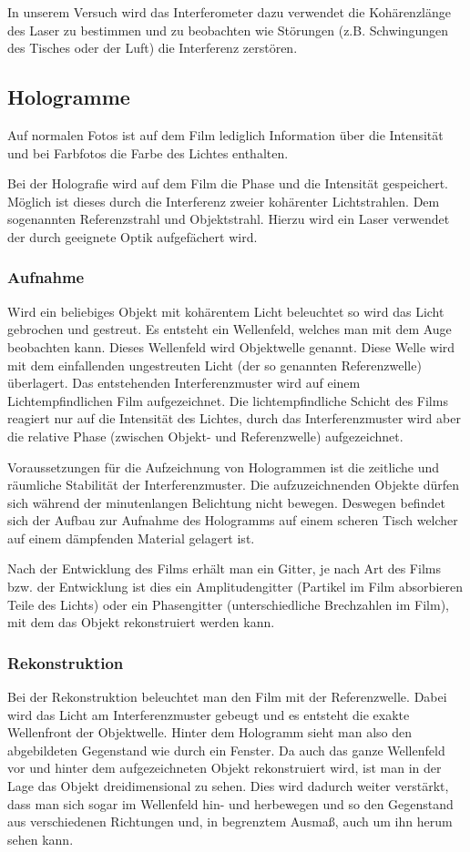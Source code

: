 \documentclass[12pt]{article}
\begin{document}
In unserem Versuch wird das Interferometer dazu verwendet die Kohärenzlänge des Laser zu bestimmen und zu beobachten wie Störungen
(z.B. Schwingungen des Tisches oder der Luft) die Interferenz zerstören.
\subsection{Hologramme}
Auf normalen Fotos ist auf dem Film lediglich Information über die Intensität und bei Farbfotos die Farbe des Lichtes enthalten.

Bei der Holografie wird auf dem Film die Phase und die Intensität gespeichert. Möglich ist dieses durch die Interferenz zweier kohärenter Lichtstrahlen.
Dem sogenannten Referenzstrahl und Objektstrahl. Hierzu wird ein Laser verwendet der durch geeignete Optik aufgefächert wird.
\subsubsection{Aufnahme}
Wird ein beliebiges Objekt mit kohärentem Licht beleuchtet so wird das Licht gebrochen und gestreut. Es entsteht ein Wellenfeld, welches man mit dem Auge
beobachten kann. Dieses Wellenfeld wird Objektwelle genannt. Diese Welle wird mit dem einfallenden ungestreuten Licht (der so genannten Referenzwelle)
überlagert. Das entstehenden Interferenzmuster wird auf einem Lichtempfindlichen Film aufgezeichnet. Die lichtempfindliche Schicht des Films reagiert nur auf
die Intensität des Lichtes, durch das Interferenzmuster wird aber die relative Phase (zwischen Objekt- und Referenzwelle) aufgezeichnet.

Voraussetzungen für die Aufzeichnung von Hologrammen ist die zeitliche und räumliche Stabilität der Interferenzmuster. Die aufzuzeichnenden Objekte dürfen
sich während der minutenlangen Belichtung nicht bewegen. Deswegen befindet sich der Aufbau zur Aufnahme des Hologramms auf einem scheren Tisch welcher auf 
einem dämpfenden Material gelagert ist. 

Nach der Entwicklung des Films erhält man ein Gitter, je nach Art des Films bzw. der Entwicklung ist dies ein Amplitudengitter (Partikel im Film absorbieren
Teile des Lichts) oder ein Phasengitter (unterschiedliche Brechzahlen im Film), mit dem das Objekt rekonstruiert werden kann.

\subsubsection{Rekonstruktion}
Bei der Rekonstruktion beleuchtet man den Film mit der Referenzwelle. Dabei wird das Licht am Interferenzmuster gebeugt und es entsteht die exakte
Wellenfront der Objektwelle. Hinter dem Hologramm sieht man also den abgebildeten Gegenstand wie durch ein Fenster.
Da auch das ganze Wellenfeld vor und hinter dem aufgezeichneten Objekt rekonstruiert wird, ist man in der Lage das Objekt dreidimensional zu sehen. Dies
wird dadurch weiter verstärkt, dass man sich sogar im Wellenfeld hin- und herbewegen und so den Gegenstand aus verschiedenen Richtungen und, in begrenztem
Ausmaß, auch um ihn herum sehen kann.
\end{document}
